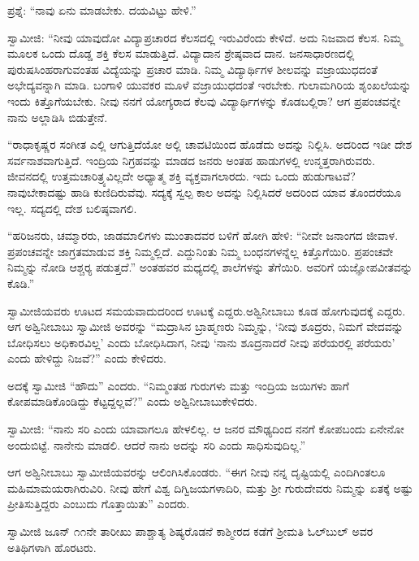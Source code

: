 \vskip 2pt

 ಪ್ರಶ್ನೆ: “ನಾವು ಏನು ಮಾಡಬೇಕು. ದಯವಿಟ್ಟು ಹೇಳಿ.” 

\vskip 2pt

 ಸ್ವಾಮೀಜಿ: “ನೀವು ಯಾವುದೋ ವಿದ್ಯಾಪ್ರಚಾರದ ಕೆಲಸದಲ್ಲಿ ಇರುವಿರೆಂದು ಕೇಳಿದೆ. ಅದು ನಿಜವಾದ ಕೆಲಸ. ನಿಮ್ಮ ಮೂಲಕ ಒಂದು ದೊಡ್ಡ ಶಕ್ತಿ ಕೆಲಸ ಮಾಡುತ್ತಿದೆ. ವಿದ್ಯಾದಾನ ಶ್ರೇಷ್ಠವಾದ ದಾನ. ಜನಸಾಧಾರಣದಲ್ಲಿ ಪುರುಷಸಿಂಹರಾಗುವಂತಹ ವಿದ್ಯೆಯನ್ನು ಪ್ರಚಾರ ಮಾಡಿ. ನಿಮ್ಮ ವಿದ್ಯಾರ್ಥಿಗಳ ಶೀಲವನ್ನು ವಜ್ರಾಯುಧದಂತೆ ಅಭೇದ್ಯವನ್ನಾಗಿ ಮಾಡಿ. ಬಂಗಾಳಿ ಯುವಕರ ಮೂಳೆ ವಜ್ರಾಯುಧದಂತೆ ಇರಬೇಕು. ಗುಲಾಮಗಿರಿಯ ಶೃಂಖಲೆಯನ್ನು ಇಂದು ಕಿತ್ತೊಗೆಯಬೇಕು. ನೀವು ನನಗೆ ಯೋಗ್ಯರಾದ ಕೆಲವು ವಿದ್ಯಾರ್ಥಿಗಳನ್ನು ಕೊಡಬಲ್ಲಿರಾ? ಆಗ ಪ್ರಪಂಚವನ್ನೇ ನಾನು ಅಲ್ಲಾಡಿಸಿ ಬಿಡುತ್ತೇನೆ. 

 “ರಾಧಾಕೃಷ್ಣರ ಸಂಗೀತ ಎಲ್ಲಿ ಆಗುತ್ತಿದೆಯೋ ಅಲ್ಲಿ ಚಾವಟಿಯಿಂದ ಹೊಡೆದು ಅದನ್ನು ನಿಲ್ಲಿಸಿ. ಅದರಿಂದ ಇಡೀ ದೇಶ ಸರ್ವನಾಶವಾಗುತ್ತಿದೆ. ಇಂದ್ರಿಯ ನಿಗ್ರಹವನ್ನು ಮಾಡದ ಜನರು ಅಂತಹ ಹಾಡುಗಳಲ್ಲಿ ಉನ್ಮತ್ತರಾಗಿರುವರು. ಜೀವನದಲ್ಲಿ ಉತ್ತಮ\break ಚಾರಿತ್ರ್ಯವಿಲ್ಲದೇ ಅಧ್ಯಾತ್ಮ ಶಕ್ತಿ ವ್ಯಕ್ತವಾಗಲಾರದು. ಇದು ಒಂದು ಹುಡುಗಾಟವೆ? ನಾವು\break ಬೇಕಾದಷ್ಟು ಹಾಡಿ ಕುಣಿದಿರುವೆವು. ಸದ್ಯಕ್ಕೆ ಸ್ವಲ್ಪ ಕಾಲ ಅದನ್ನು ನಿಲ್ಲಿಸಿದರೆ ಅದರಿಂದ ಯಾವ ತೊಂದರೆಯೂ ಇಲ್ಲ. ಸದ್ಯದಲ್ಲಿ ದೇಶ ಬಲಿಷ್ಠವಾಗಲಿ.

 “ಹರಿಜನರು, ಚಮ್ಮಾರರು, ಜಾಡಮಾಲಿಗಳು ಮುಂತಾದವರ ಬಳಿಗೆ ಹೋಗಿ ಹೇಳಿ: “ನೀವೇ ಜನಾಂಗದ ಜೀವಾಳ. ಪ್ರಪಂಚವನ್ನೇ ಜಾಗ್ರತಮಾಡುವ ಶಕ್ತಿ ನಿಮ್ಮಲ್ಲಿದೆ. ಎದ್ದುನಿಂತು ನಿಮ್ಮ ಬಂಧನಗಳನ್ನೆಲ್ಲ ಕಿತ್ತೊಗೆಯಿರಿ. ಪ್ರಪಂಚವೇ ನಿಮ್ಮನ್ನು ನೋಡಿ ಆಶ್ಚರ‍್ಯ ಪಡುತ್ತದೆ.” ಅಂತಹವರ ಮಧ್ಯದಲ್ಲಿ ಶಾಲೆಗಳನ್ನು ತೆಗೆಯಿರಿ. ಅವರಿಗೆ ಯಜ್ಞೋಪವೀತವನ್ನು ಕೊಡಿ.” 

 ಸ್ವಾಮೀಜಿಯವರು ಊಟದ ಸಮಯವಾದುದರಿಂದ ಊಟಕ್ಕೆ ಎದ್ದರು.\break ಅಶ್ವಿನೀಬಾಬು ಕೂಡ ಹೋಗುವುದಕ್ಕೆ ಎದ್ದರು. ಆಗ ಅಶ್ವಿನೀಬಾಬು ಸ್ವಾಮೀಜಿ ಅವರನ್ನು “ಮದ್ರಾಸಿನ ಬ್ರಾಹ್ಮಣರು ನಿಮ್ಮನ್ನು, ‘ನೀವು ಶೂದ್ರರು, ನಿಮಗೆ ವೇದವನ್ನು ಬೋಧಿಸಲು ಅಧಿಕಾರವಿಲ್ಲ’ ಎಂದು ಬೋಧಿಸಿದಾಗ, ನೀವು ‘ನಾನು ಶೂದ್ರನಾದರೆ ನೀವು ಪರೆಯರಲ್ಲಿ ಪರೆಯರು’ ಎಂದು ಹೇಳಿದ್ದು ನಿಜವೆ?” ಎಂದು ಕೇಳಿದರು. 

 ಅದಕ್ಕೆ ಸ್ವಾಮೀಜಿ “ಹೌದು” ಎಂದರು. “ನಿಮ್ಮಂತಹ ಗುರುಗಳು ಮತ್ತು ಇಂದ್ರಿಯ ಜಯಿಗಳು ಹಾಗೆ ಕೋಪಮಾಡಿಕೊಂಡಿದ್ದು ಕೆಟ್ಟದ್ದಲ್ಲವೆ?” ಎಂದು ಅಶ್ವಿನೀಬಾಬು\break ಕೇಳಿದರು. 

 ಸ್ವಾಮೀಜಿ: “ನಾನು ಸರಿ ಎಂದು ಯಾವಾಗಲೂ ಹೇಳಲಿಲ್ಲ. ಆ ಜನರ ಮೌಢ್ಯದಿಂದ ನನಗೆ ಕೋಪಬಂದು ಏನೇನೋ ಅಂದುಬಿಟ್ಟೆ. ನಾನೇನು ಮಾಡಲಿ. ಆದರೆ ನಾನು ಅದನ್ನು ಸರಿ ಎಂದು ಸಾಧಿಸುವುದಿಲ್ಲ.” 

 ಆಗ ಅಶ್ವಿನೀಬಾಬು ಸ್ವಾಮೀಜಿಯವರನ್ನು ಆಲಿಂಗಿಸಿಕೊಂಡರು. “ಈಗ ನೀವು ನನ್ನ ದೃಷ್ಟಿಯಲ್ಲಿ ಎಂದಿಗಿಂತಲೂ ಮಹಿಮಾಮಯರಾಗಿರುವಿರಿ. ನೀವು ಹೇಗೆ ವಿಶ್ವ ದಿಗ್ವಿಜಯಗಳಾದಿರಿ, ಮತ್ತು ಶ‍್ರೀ ಗುರುದೇವರು ನಿಮ್ಮನ್ನು ಏತಕ್ಕೆ ಅಷ್ಟು ಪ್ರೀತಿಸುತ್ತಿದ್ದರು ಎಂಬುದು ಗೊತ್ತಾಯಿತು” ಎಂದರು. 

 ಸ್ವಾಮೀಜಿ ಜೂನ್ ೧೧ನೇ ತಾರೀಖು ಪಾಶ್ಚಾತ್ಯ ಶಿಷ್ಯರೊಡನೆ ಕಾಶ್ಮೀರದ ಕಡೆಗೆ ಶ‍್ರೀಮತಿ ಓಲ್‍ಬುಲ್ ಅವರ ಅತಿಥಿಗಳಾಗಿ ಹೊರಟರು. 

